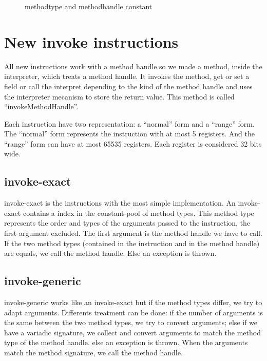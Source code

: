 \documentclass{sig-alternate}
\begin{document}
  \begin{figure}[!h]
    \centering 
    \caption{methodtype and methodhandle constant}
    \label{MTMHldc}
  \end{figure}

\section{New invoke instructions}
  All new instructions work with a method handle so we made a method, inside the interpreter, which treats a method handle.
  It invokes the method, get or set a field or call the interpret depending to the kind of the method handle
  and uses the interpreter mecanism to store the return value.
  This method is called ``invokeMethodHandle''.
  
  Each instruction have two representation: a ``normal'' form and a ``range'' form.
  The ``normal'' form represents the instruction with at most 5 registers.
  And the ``range'' form can have at most 65535 registers.
  Each register is considered 32 bits wide.

  \subsection{invoke-exact}

    invoke-exact is the instructions with the most simple implementation.
    An invoke-exact contains a index in the constant-pool of method types.
    This method type represents the order and types of the arguments passed to the instruction, the first argument excluded.
    The first argument is the method handle we have to call.
    If the two method types (contained in the instruction and in the method handle) are equals, we call the method handle.
    Else an exception is thrown.

  \subsection{invoke-generic}

    invoke-generic works like an invoke-exact but if the method types differ, we try to adapt arguments.
    Differents treatment can be done:
    if the number of arguments is the same between the two method types, we try to convert arguments;
    else if we have a variadic signature, we collect and convert arguments to match the method type of the method handle.
    else an exception is thrown.
    When the arguments match the method signature, we call the method handle.
\end{document}
